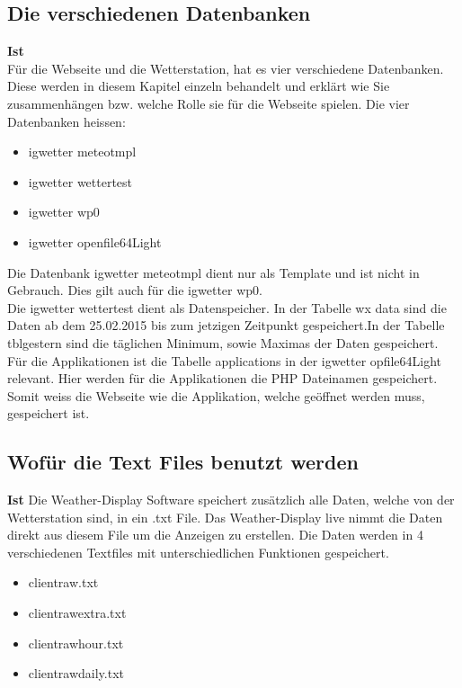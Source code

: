 \subsection{Die verschiedenen Datenbanken}
\textbf{Ist}\\
Für die Webseite und die Wetterstation, hat es vier verschiedene Datenbanken. Diese werden in diesem Kapitel einzeln behandelt und erklärt wie Sie zusammenhängen bzw. welche Rolle sie für die Webseite spielen. Die vier Datenbanken heissen:
\begin{itemize}  
\item igwetter meteotmpl
\item igwetter wettertest
\item igwetter wp0
\item igwetter openfile64Light
\end{itemize}

Die Datenbank igwetter meteotmpl dient nur als Template und ist nicht in Gebrauch. Dies gilt auch für die igwetter wp0.\\


Die igwetter wettertest dient als Datenspeicher. In der Tabelle wx data sind die Daten ab dem 25.02.2015 bis zum jetzigen Zeitpunkt gespeichert.In der Tabelle tblgestern  sind die täglichen Minimum, sowie Maximas der Daten gespeichert.\\
Für die Applikationen ist die Tabelle applications in der igwetter opfile64Light relevant. Hier werden für die Applikationen die PHP Dateinamen gespeichert. Somit weiss die Webseite wie die Applikation, welche geöffnet werden muss, gespeichert ist.\\



\subsection{Wofür die Text Files benutzt werden}
\textbf{Ist}
Die Weather-Display Software speichert zusätzlich alle Daten, welche von der Wetterstation sind, in ein .txt File. Das Weather-Display live nimmt die Daten direkt aus diesem File um die Anzeigen zu erstellen. Die Daten werden in 4 verschiedenen Textfiles mit unterschiedlichen Funktionen gespeichert.
\begin{itemize}  
\item clientraw.txt
\item clientrawextra.txt
\item clientrawhour.txt
\item clientrawdaily.txt
\end{itemize}


